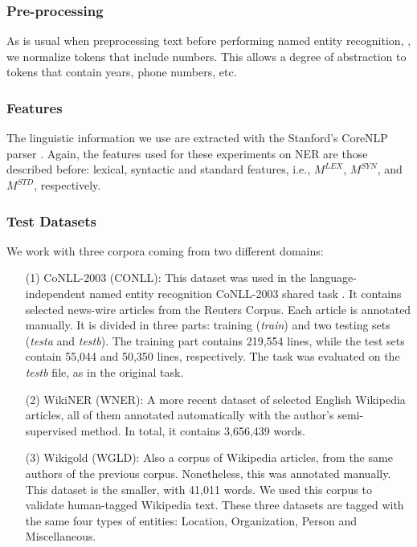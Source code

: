 \documentclass{llncs}
\begin{document}
\subsubsection{Pre-processing}

As is usual when preprocessing text before performing named entity recognition, \cite{RatinovR09}, we normalize tokens that include numbers. 
This allows a degree of abstraction to tokens that contain years, phone numbers, etc. 

\subsubsection{Features}
The linguistic information we use are extracted with the Stanford's CoreNLP parser \cite{manning2014}. Again, the features used for these experiments on NER are those described before: lexical, syntactic and standard features, i.e., $M^{LEX}$, $M^{SYN}$, and $M^{STD}$, respectively. 

\subsubsection{Test Datasets}We work with three corpora coming from two different domains:
\begin{itemize}
\item [(1)] CoNLL-2003 (CONLL): This dataset was used in the language-independent named entity recognition CoNLL-2003 shared task \cite{SangM03}. It contains selected news-wire articles from the Reuters Corpus. Each article is annotated manually. It is divided in three parts:  training (\textit{train}) and two testing sets (\textit{testa} and \textit{testb}). The training part contains 219,554 lines, while the test sets contain 55,044 and 50,350 lines, respectively. The task was evaluated on the \textit{testb} file, as in the original task.
\item [(2)]WikiNER (WNER): A more recent dataset \cite{Balasuriya2009} of selected English \allowbreak Wikipedia articles, all of them annotated automatically with the author's semi-supervised \allowbreak method. In total, it contains 3,656,439 words. 
\item[(3)] Wikigold (WGLD): Also a corpus of Wikipedia articles, from the same authors of the previous corpus. Nonetheless, this was annotated manually. This dataset is the smaller, with 41,011 words. We used this corpus to validate human-tagged Wikipedia text. These three datasets are tagged with the same four types of entities: Location, Organization, Person and Miscellaneous.


\end{itemize}
%
\end{document}
